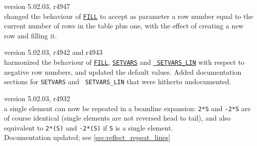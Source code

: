 \begin{madlist}
  
   version 5.02.03, r4947 \\
  changed the behaviour of \hyperref[sec:fill]{\tt FILL} to accept as
  parameter a row number equal to the current number of rows in the
  table plus one, with the effect of creating a new row and filling it. 
  
  
   version 5.02.03, r4942 and r4943\\
  harmonized the behaviour of \hyperref[sec:fill]{\tt FILL},
  \hyperref[sec:setvars]{\tt SETVARS} and \hyperref[sec:setvars_lin]{\tt
  	SETVARS\_LIN} with respect to negative row numbers, and updated the
  default values. Added documentation sections for {\tt SETVARS} and {\tt
  	SETVARS\_LIN} that were hitherto undocumented.  
  
  
   version 5.02.03, r4932 \\
  a single element can now be repeated in a beamline expansion:
  \texttt{2*S} and \texttt{-2*S} are of course identical (single
  elements are not reversed head to tail), and also equivalent to
  \texttt{2*(S)} and \texttt{-2*(S)} if \texttt{S} is a single
  element.\\
  Documentation updated; see \ref{sec:reflect_repeat_lines}


\end{madlist}
  


\newpage

